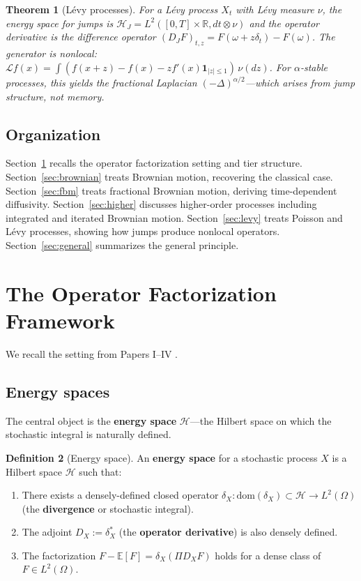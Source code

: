 \documentclass[11pt]{article}
\newtheorem{theorem}{Theorem}[section]
\theoremstyle{definition}
\newtheorem{definition}[theorem]{Definition}
\newcommand{\E}{\mathbb{E}}
\newcommand{\R}{\mathbb{R}}
\newcommand{\Hi}{\mathcal{H}}
\begin{document}
\begin{theorem}[L\'evy processes]\label{thm:main-levy}
For a L\'evy process $X_t$ with L\'evy measure $\nu$, the energy space for jumps is $\Hi_J = L^2([0,T] \times \R, dt \otimes \nu)$ and the operator derivative is the difference operator $(D_J F)_{t,z} = F(\omega + z\delta_t) - F(\omega)$. The generator is nonlocal: $\mathcal{L}f(x) = \int(f(x+z) - f(x) - zf'(x)\mathbf{1}_{|z|\leq 1})\,\nu(dz)$. For $\alpha$-stable processes, this yields the fractional Laplacian $(-\Delta)^{\alpha/2}$---which arises from jump structure, not memory.
\end{theorem}

\subsection{Organization}

Section~\ref{sec:setting} recalls the operator factorization setting and tier structure. Section~\ref{sec:brownian} treats Brownian motion, recovering the classical case. Section~\ref{sec:fbm} treats fractional Brownian motion, deriving time-dependent diffusivity. Section~\ref{sec:higher} discusses higher-order processes including integrated and iterated Brownian motion. Section~\ref{sec:levy} treats Poisson and L\'evy processes, showing how jumps produce nonlocal operators. Section~\ref{sec:general} summarizes the general principle.

\section{The Operator Factorization Framework}\label{sec:setting}

We recall the setting from Papers I--IV \cite{PaperI,PaperII,PaperIII,PaperIV}.

\subsection{Energy spaces}

The central object is the \textbf{energy space} $\Hi$---the Hilbert space on which the stochastic integral is naturally defined.

\begin{definition}[Energy space]
An \textbf{energy space} for a stochastic process $X$ is a Hilbert space $\Hi$ such that:
\begin{enumerate}
\item[(i)] There exists a densely-defined closed operator $\delta_X : \mathrm{dom}(\delta_X) \subset \Hi \to L^2(\Omega)$ (the \textbf{divergence} or stochastic integral).
\item[(ii)] The adjoint $D_X := \delta_X^*$ (the \textbf{operator derivative}) is also densely defined.
\item[(iii)] The factorization $F - \E[F] = \delta_X(\Pi D_X F)$ holds for a dense class of $F \in L^2(\Omega)$.
\end{enumerate}
\end{definition}
\end{document}

